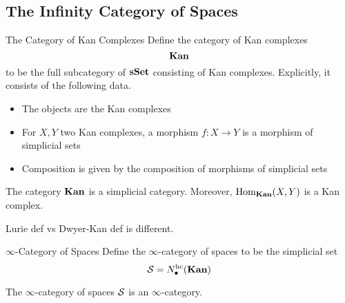 \documentclass[a4paper]{article}
\begin{document}
\subsection{The Infinity Category of Spaces}
\begin{defn}{The Category of Kan Complexes}{} Define the category of Kan complexes $$\bold{Kan}$$ to be the full subcategory of $\bold{sSet}$ consisting of Kan complexes. Explicitly, it consists of the following data. 
\begin{itemize}
\item The objects are the Kan complexes
\item For $X,Y$ two Kan complexes, a morphism $f:X\to Y$ is a morphism of simplicial sets
\item Composition is given by the composition of morphisms of simplicial sets
\end{itemize}
\end{defn}

\begin{lmm}{}{} The category $\bold{Kan}$ is a simplicial category. Moreover, $\operatorname{Hom}_\bold{Kan}(X,Y)$ is a Kan complex. 
\end{lmm}

Lurie def vs Dwyer-Kan def is different. 

\begin{defn}{$\infty$-Category of Spaces}{} Define the $\infty$-category of spaces to be the simplicial set $$\mathcal{S}=N_\bullet^\text{hc}(\bold{Kan})$$
\end{defn}

\begin{lmm}{}{} The $\infty$-category of spaces $\mathcal{S}$ is an $\infty$-category. 
\end{lmm}
\end{document}
